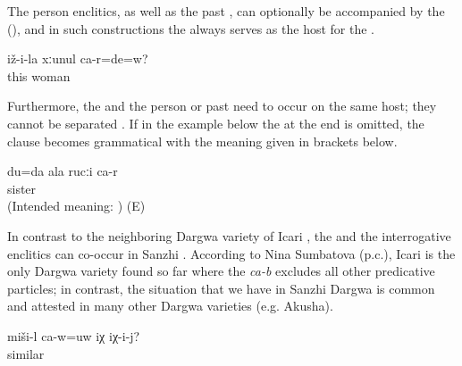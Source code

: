 The person enclitics, as well as the past , can optionally be accompanied by the  (), and in such constructions the  always serves as the host for the  . 

%
\begin{exe}
	\ex	\label{ex:‎‎‎Are you his wife}
	\gll	iž-i-la	xːunul	ca-r=de=w?\\
		this	woman	\\
	\glt	{}
\end{exe}

Furthermore, the  and the person  or past  need to occur on the same host; they cannot be separated . If in the example below the  at the end is omitted, the clause becomes grammatical with the meaning given in brackets below. 
%
\begin{exe}
	\ex	\label{ex:It is me who is your sister.}
	\gll	{*} du=da	ala	rucːi	ca-r\\
		{} 		sister	\\
	\glt	(Intended meaning: ) (E)
\end{exe}

In contrast to the neighboring Dargwa variety of Icari \citep[138]{Sumbatova.Mutalov2003}, the  and the interrogative enclitics can co-occur in Sanzhi . According to Nina Sumbatova (p.c.), Icari is the only Dargwa variety found so far where the  \textit{ca-b} excludes all other predicative particles; in contrast, the situation that we have in Sanzhi Dargwa is common and attested in many other Dargwa varieties (e.g. Akusha). 

\begin{exe}
	\ex	\label{ex:Is this similar to himSyntax}
	\gll	miši-l	ca-w=uw	iχ	iχ-i-j?\\
		similar		\tsc{dem.down}	\\
	\glt	{}
\end{exe}

